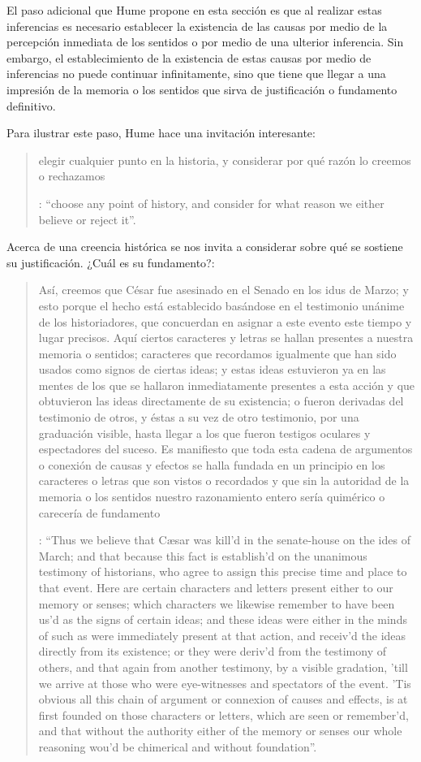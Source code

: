 El paso adicional que Hume propone en esta sección es que al realizar estas inferencias es necesario establecer la existencia de las causas por medio de la percepción inmediata de los sentidos o por medio de una ulterior inferencia. Sin embargo, el establecimiento de la existencia de estas causas por medio de inferencias no puede continuar infinitamente, sino que tiene que llegar a una impresión de la memoria o los sentidos que sirva de justificación o fundamento definitivo.

Para ilustrar este paso, Hume hace una invitación interesante: \blockquote[{\Cite[58]{hume1740treatise}}: \enquote{choose any point of history, and consider for what reason we either believe or reject it}.]{elegir cualquier punto en la historia, y considerar por qué razón lo creemos o rechazamos}. Acerca de una creencia histórica se nos invita a considerar sobre qué se sostiene su justificación. ¿Cuál es su fundamento?: \blockquote[{\Cite[58-59]{hume1740treatise}}: \enquote{Thus we believe that Cæsar was kill’d in the senate-house on the ides of March; and that because this fact is establish’d on the unanimous testimony of historians, who agree to assign this precise time and place to that event. Here are certain characters and letters present either to our memory or senses; which characters we likewise remember to have been us’d as the signs of certain ideas; and these ideas were either in the minds of such as were immediately present at that action, and receiv’d the ideas directly from its existence; or they were deriv’d from the testimony of others, and that again from another testimony, by a visible gradation, ’till we arrive at those who were eye-witnesses and spectators of the event. ’Tis obvious all this chain of argument or connexion of causes and effects, is at first founded on those characters or letters, which are seen or remember’d, and that without the authority either of the memory or senses our whole reasoning wou’d be chimerical and without foundation}.]{Así, creemos que César fue asesinado en el Senado en los idus de Marzo; y esto porque el hecho está establecido basándose en el testimonio unánime de los historiadores, que concuerdan en asignar a este evento este tiempo y lugar precisos. Aquí ciertos caracteres y letras se hallan presentes a nuestra memoria o sentidos; caracteres que recordamos igualmente que han sido usados como signos de ciertas ideas; y estas ideas estuvieron ya en las mentes de los que se hallaron inmediatamente presentes a esta acción y que obtuvieron las ideas directamente de su existencia; o fueron derivadas del testimonio de otros, y éstas a su vez de otro testimonio, por una graduación visible, hasta llegar a los que fueron testigos oculares y espectadores del suceso. Es manifiesto que toda esta cadena de argumentos o conexión de causas y efectos se halla fundada en un principio en los caracteres o letras que son vistos o recordados y que sin la autoridad de la memoria o los sentidos nuestro razonamiento entero sería quimérico o carecería de fundamento}.

